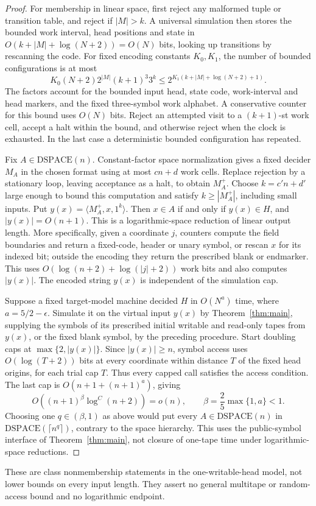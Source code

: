 \begin{proof}
For membership in linear space, first reject any malformed tuple or transition
table, and reject if \(|M|>k\). A universal simulation then stores the
bounded work interval, head positions and state in
\(O(k+|M|+\log(N+2))=O(N)\) bits, looking up transitions by rescanning
the code. For fixed encoding constants \(K_0,K_1\), the number of bounded
configurations is at most
\[
 K_0(N+2)2^{|M|}(k+1)^3 3^k
 \le 2^{K_1(k+|M|+\log(N+2)+1)}.
\]
The factors account for the bounded input head, state code, work-interval
and head markers, and the fixed three-symbol work alphabet. A conservative
counter for this bound uses \(O(N)\) bits. Reject an attempted visit to a
\((k+1)\)-st work cell, accept a halt within the bound, and otherwise
reject when the clock is exhausted. In the last case a deterministic
bounded configuration has repeated.

Fix \(A\in\mathrm{DSPACE}(n)\). Constant-factor space normalization
gives a fixed decider \(M_A\) in the chosen format using at most \(cn+d\)
work cells. Replace rejection by a stationary loop, leaving acceptance
as a halt, to obtain \(M_A^+\). Choose \(k=c'n+d'\) large enough to
bound this computation and satisfy \(k\ge |M_A^+|\), including small
inputs. Put \(y(x)=\langle M_A^+,x,1^k\rangle\). Then \(x\in A\) if and
only if \(y(x)\in H\), and \(|y(x)|=O(n+1)\).
This is a logarithmic-space reduction of linear output length.
More specifically, given a coordinate \(j\), counters compute the field
boundaries and return a fixed-code, header or unary symbol, or rescan
\(x\) for its indexed bit; outside the encoding they return the prescribed
blank or endmarker. This uses
\(O(\log(n+2)+\log(|j|+2))\) work bits and also computes \(|y(x)|\).
The encoded string \(y(x)\) is independent of the simulation cap.

Suppose a fixed target-model machine decided \(H\) in \(O(N^a)\) time,
where \(a=5/2-\epsilon\). Simulate it on the virtual input \(y(x)\) by
Theorem~\ref{thm:main}, supplying the symbols of its prescribed initial
writable and read-only tapes from \(y(x)\), or the fixed blank symbol,
by the preceding procedure. Start doubling caps at
\(\max\{2,|y(x)|\}\). Since \(|y(x)|\ge n\), symbol access uses
\(O(\log(T+2))\) bits at every coordinate within distance \(T\) of
the fixed head origins, for each trial cap \(T\). Thus every capped call
satisfies the access condition. The last cap is
\(O(n+1+(n+1)^a)\), giving
\[
 O\!\left((n+1)^\beta\log^C(n+2)\right)=o(n),
 \qquad \beta=\frac25\max\{1,a\}<1.
\]
Choosing one \(q\in(\beta,1)\) as above would put every
\(A\in\mathrm{DSPACE}(n)\) in \(\mathrm{DSPACE}(\lceil n^q\rceil)\),
contrary to the space hierarchy. This uses the public-symbol interface
of Theorem~\ref{thm:main}, not closure of one-tape time under
logarithmic-space reductions.
\end{proof}

These are class nonmembership statements in the one-writable-head model,
not lower bounds on every input length. They assert no general multitape
or random-access bound and no logarithmic endpoint.
